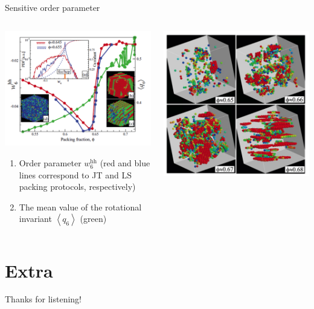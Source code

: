 \documentclass{bredelebeamer}
\begin{document}
\begin{frame}{Sensitive order parameter}
\begin{columns}
\begin{column}{0.5\textwidth}
\centerline{\includegraphics[scale=0.2]{images/pp9.png}}
\begin{enumerate}
\item Order parameter $w_{6}^{\mathrm{hh}}$ (red and blue lines correspond
to JT and LS packing protocols, respectively)
\item The mean value of the rotational invariant $\left\langle q_{6}\right\rangle$ (green)
\end{enumerate}
\end{column}

\begin{column}{0.5\textwidth}
\centerline{\includegraphics[scale=0.2]{images/pp10.png}}
\end{column}
\end{columns}
\end{frame}

\section{Extra}
\begin{frame}
\centerline{Thanks for listening!}
\end{frame}
\end{document}
